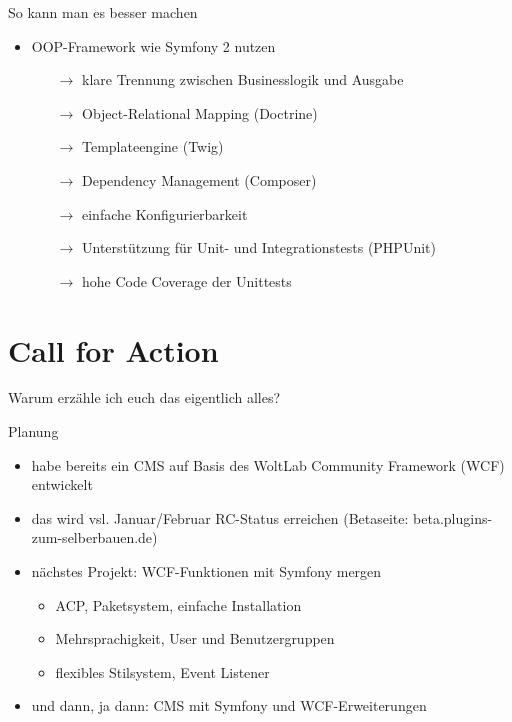 \documentclass{beamer}
\begin{document}
\begin{frame}{So kann man es besser machen}
	\begin{itemize}
		\item	OOP-Framework wie Symfony 2 nutzen
		\begin{itemize}
			\item[$\rightarrow$] klare Trennung zwischen Businesslogik und Ausgabe
			\item[$\rightarrow$] Object-Relational Mapping (Doctrine)
			\item[$\rightarrow$] Templateengine (Twig)	
			\item[$\rightarrow$] Dependency Management (Composer)
			\item[$\rightarrow$] einfache Konfigurierbarkeit
			\item[$\rightarrow$] Unterstützung für Unit- und Integrationstests (PHPUnit)
			\item[$\rightarrow$] hohe Code Coverage der Unittests
		\end{itemize}
	\end{itemize}
\end{frame}

\section{Call for Action}
\begin{frame}
	\centering
	Warum erzähle ich euch das eigentlich alles?
\end{frame}

\begin{frame}{Planung}
	\begin{itemize}
		\item	habe bereits ein CMS auf Basis des WoltLab Community Framework (WCF) entwickelt
		\item	das wird vsl. Januar/Februar RC-Status erreichen (Betaseite: beta.plugins-zum-selberbauen.de)
		\item	nächstes Projekt: WCF-Funktionen mit Symfony mergen
		\begin{itemize}
			\item	ACP, Paketsystem, einfache Installation
			\item	Mehrsprachigkeit, User und Benutzergruppen
			\item	flexibles Stilsystem, Event Listener
		\end{itemize}
		\item	und dann, ja dann: CMS mit Symfony und WCF-Erweiterungen
	\end{itemize}
\end{frame}
\end{document}
